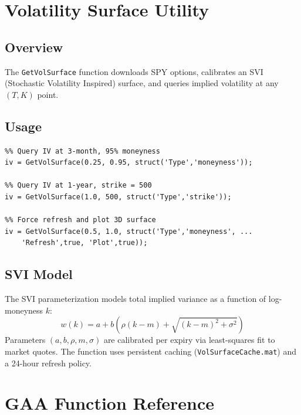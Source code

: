 \documentclass[11pt,a4paper]{article}
\begin{document}
\section{Volatility Surface Utility}

\subsection{Overview}
The \texttt{GetVolSurface} function downloads SPY options, calibrates an SVI (Stochastic Volatility Inspired) surface, and queries implied volatility at any $(T, K)$ point.

\subsection{Usage}
\begin{lstlisting}
%% Query IV at 3-month, 95% moneyness
iv = GetVolSurface(0.25, 0.95, struct('Type','moneyness'));

%% Query IV at 1-year, strike = 500
iv = GetVolSurface(1.0, 500, struct('Type','strike'));

%% Force refresh and plot 3D surface
iv = GetVolSurface(0.5, 1.0, struct('Type','moneyness', ...
    'Refresh',true, 'Plot',true));
\end{lstlisting}

\subsection{SVI Model}
The SVI parameterization models total implied variance as a function of log-moneyness $k$:
\begin{equation}
w(k) = a + b\left(\rho(k - m) + \sqrt{(k - m)^2 + \sigma^2}\right)
\end{equation}
Parameters $(a, b, \rho, m, \sigma)$ are calibrated per expiry via least-squares fit to market quotes. The function uses persistent caching (\texttt{VolSurfaceCache.mat}) and a 24-hour refresh policy.
\newpage
\section{GAA Function Reference}
\end{document}
